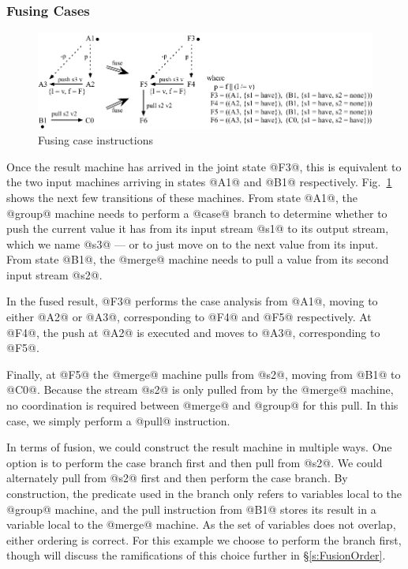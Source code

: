 \subsubsection{Fusing Cases}
\begin{figure}
\includegraphics[scale=1.1]{figures/fuse-case-pull.pdf}
\caption{Fusing case instructions}
\label{fig:Fusion:Case}
\end{figure}

Once the result machine has arrived in the joint state @F3@, this is equivalent to the two input machines arriving in states @A1@ and @B1@ respectively.
Fig.~\ref{fig:Fusion:Case} shows the next few transitions of these machines.
From state @A1@, the @group@ machine needs to perform a @case@ branch to determine whether to push the current value it has from its input stream @s1@ to its output stream, which we name @s3@ --- or to just move on to the next value from its input.
From state @B1@, the @merge@ machine needs to pull a value from its second input stream @s2@. 

In the fused result, @F3@ performs the case analysis from @A1@, moving to either @A2@ or @A3@, corresponding to @F4@ and @F5@ respectively.
At @F4@, the push at @A2@ is executed and moves to @A3@, corresponding to @F5@.

Finally, at @F5@ the @merge@ machine pulls from @s2@, moving from @B1@ to @C0@.
Because the stream @s2@ is only pulled from by the @merge@ machine, no coordination is required between @merge@ and @group@ for this pull.
In this case, we simply perform a @pull@ instruction.

In terms of fusion, we could construct the result machine in multiple ways.
One option is to perform the case branch first and then pull from @s2@.
We could alternately pull from @s2@ first and then perform the case branch.
By construction, the predicate used in the branch only refers to variables local to the @group@ machine, and the pull instruction from @B1@ stores its result in a variable local to the @merge@ machine.
As the set of variables does not overlap, either ordering is correct.
For this example we choose to perform the branch first, though will discuss the ramifications of this choice further in \S\ref{s:FusionOrder}.

